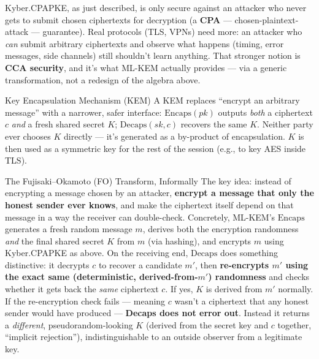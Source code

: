 Kyber.CPAPKE, as just described, is only secure against an attacker who never gets to submit chosen ciphertexts for decryption (a \textbf{CPA} --- chosen-plaintext-attack --- guarantee). Real protocols (TLS, VPNs) need more: an attacker who \emph{can} submit arbitrary ciphertexts and observe what happens (timing, error messages, side channels) still shouldn't learn anything. That stronger notion is \textbf{CCA security}, and it's what ML-KEM actually provides --- via a generic transformation, not a redesign of the algebra above.

\begin{defbox}{Key Encapsulation Mechanism (KEM)}
A KEM replaces ``encrypt an arbitrary message'' with a narrower, safer interface: $\mathrm{Encaps}(pk)$ outputs \emph{both} a ciphertext $c$ \emph{and} a fresh shared secret $K$; $\mathrm{Decaps}(sk, c)$ recovers the same $K$. Neither party ever chooses $K$ directly --- it's generated as a by-product of encapsulation. $K$ is then used as a symmetric key for the rest of the session (e.g., to key AES inside TLS).
\end{defbox}

\begin{rmkbox}{The Fujisaki--Okamoto (FO) Transform, Informally}
The key idea: instead of encrypting a message chosen by an attacker, \textbf{encrypt a message that only the honest sender ever knows}, and make the ciphertext itself depend on that message in a way the receiver can double-check. Concretely, ML-KEM's $\mathrm{Encaps}$ generates a fresh random message $m$, derives both the encryption randomness \emph{and} the final shared secret $K$ from $m$ (via hashing), and encrypts $m$ using Kyber.CPAPKE as above. On the receiving end, $\mathrm{Decaps}$ does something distinctive: it decrypts $c$ to recover a candidate $m'$, then \textbf{re-encrypts $m'$ using the exact same (deterministic, derived-from-$m'$) randomness} and checks whether it gets back the \emph{same} ciphertext $c$. If yes, $K$ is derived from $m'$ normally. If the re-encryption check fails --- meaning $c$ wasn't a ciphertext that any honest sender would have produced --- \textbf{Decaps does not error out}. Instead it returns a \emph{different}, pseudorandom-looking $K$ (derived from the secret key and $c$ together, ``implicit rejection''), indistinguishable to an outside observer from a legitimate key.
\end{rmkbox}

